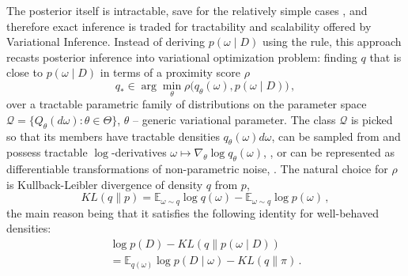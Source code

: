 \documentclass[a4paper,10pt]{article}
\begin{document}
The posterior itself is intractable, save for the relatively simple cases \citep{citation_needed},
and therefore exact inference is traded for tractability and scalability offered by Variational
Inference. Instead of deriving $p(\omega \mid D)$ using the rule, this approach recasts
posterior inference into variational optimization problem: finding $q$ that is close to
$p(\omega \mid D)$ in terms of a proximity score $\rho$
\begin{equation}  \label{eq:variational-progam}
  q_*
    \in \arg \min_{\theta} \rho\bigl(
      q_\theta(\omega), p(\omega \mid D)
    \bigr)
    \,,
\end{equation}
over a tractable parametric family of distributions on the parameter space $
  \mathcal{Q} = \{Q_\theta(d\omega) \colon \theta \in \Theta\}
$, $\theta$ -- generic variational parameter. The class $\mathcal{Q}$ is picked so that
its members have tractable densities $
  q_\theta(\omega) d\omega
$, can be sampled from and possess tractable $\log$-derivatives $
  \omega \mapsto \nabla_\theta \log q_\theta(\omega)
$, \citep{williams_simple_1992}, or can be represented as differentiable transformations
of non-parametric noise, \citep{kingma_auto-encoding_2014,figurnov_implicit_2019}.
%
The natural choice for $\rho$ is Kullback-Leibler divergence of density $q$ from $p$,
\begin{equation}  \label{eq:kl-div-def}
  KL(q \| p)
    = \mathbb{E}_{\omega \sim q}
      \log{q(\omega)}
    - \mathbb{E}_{\omega \sim q}
      \log{p(\omega)}
    \,,
\end{equation}
the main reason being that it satisfies the following identity for well-behaved densities:
\begin{multline}  \label{eq:kl-div-master}
  \log p(D)
    - KL(q \| p(\omega \mid D))
    \\ = \mathbb{E}_{q(\omega)} \log{p(D \mid \omega)}
    - KL(q \| \pi)
    \,.
\end{multline}
\end{document}
